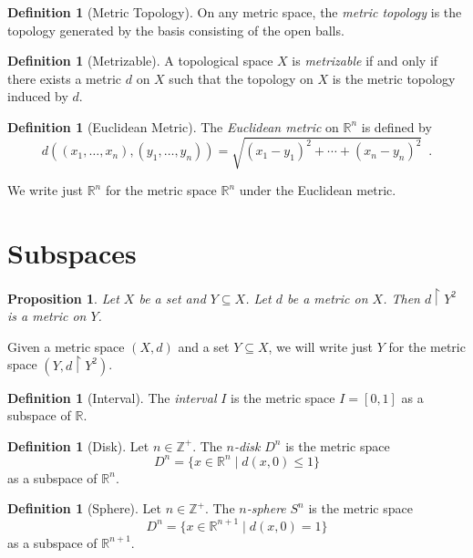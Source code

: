 \documentclass{book}
\newtheorem{proposition}[lemma]{Proposition}
\theoremstyle{definition}
\newtheorem{definition}[lemma]{Definition}
\newcommand{\Real}{\ensuremath{\mathbb{R}}}
\begin{document}
\begin{definition}[Metric Topology]
    On any metric space, the \emph{metric topology} is the topology generated by the basis consisting of the open balls.
\end{definition}

\begin{definition}[Metrizable]
    A topological space $X$ is \emph{metrizable} if and only if there exists a metric $d$ on $X$ such that the topology on $X$
    is the metric topology induced by $d$.
\end{definition}

\begin{definition}[Euclidean Metric]
    The \emph{Euclidean metric} on $\Real^n$ is defined by
    \[ d((x_1, \ldots, x_n),(y_1, \ldots, y_n)) = \sqrt{(x_1 - y_1)^2 + \cdots + (x_n - y_n)^2} \enspace . \]
\end{definition}

We write just $\Real^n$ for the metric space $\Real^n$ under the Euclidean metric.

\section{Subspaces}

\begin{proposition}
    Let $X$ be a set and $Y \subseteq X$. Let $d$ be a metric on $X$. Then $d \restriction Y^2$ is a metric on $Y$.
\end{proposition}

Given a metric space $(X,d)$ and a set $Y \subseteq X$, we will write just $Y$ for the metric space $(Y, d \restriction Y^2)$.

\begin{definition}[Interval]
    The \emph{interval} $I$ is the metric space $I = [0,1]$ as a subspace of $\Real$.
\end{definition}

\begin{definition}[Disk]
    Let $n \in \mathbb{Z}^+$. The \emph{$n$-disk} $D^n$ is the metric space
    \[ D^n = \{ x \in \Real^n \mid d(x,0) \leq 1 \} \]
    as a subspace of $\Real^n$.
\end{definition}

\begin{definition}[Sphere]
    Let $n \in \mathbb{Z}^+$. The \emph{$n$-sphere} $S^n$ is the metric space
    \[ D^n = \{ x \in \Real^{n+1} \mid d(x,0) = 1 \} \]
    as a subspace of $\Real^{n+1}$.
\end{definition}
\end{document}
